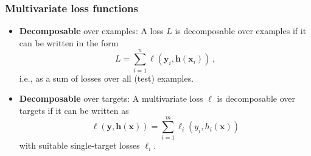 \documentclass[]{beamer}
\newcommand{\bx}{\boldsymbol{x}}
\newcommand{\by}{\boldsymbol{y}}
\newcommand{\bh}{\boldsymbol{h}}
\renewcommand{\emph}[1]{\textbf{\color{putblue}#1}}
\begin{document}
\begin{frame}
\frametitle{Multivariate loss functions}

\begin{itemize}
\item \emph{Decomposable} over examples: A loss $L$ is decomposable over examples if it can be written in the form
$$
L = \sum_{i=1}^n \ell(\by_i, \bh(\bx_i)) 
\, ,
$$
i.e., as a sum of losses over all (test) examples. 

\item \emph{Decomposable} over targets: A multivariate loss $\ell$ is decomposable over targets if it can be written as
$$
\ell(\by, \bh(\bx)) = \sum_{i=1}^m \ell_i(y_i, h_i(\bx)) 
$$
with suitable single-target losses $\ell_i$. 

\end{itemize}

\end{frame}
\end{document}
